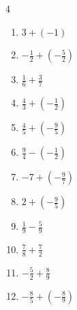 \begin{multicols}{4}
\begin{enumerate}
  \item $\displaystyle 3 + \left(-1\right)$

        \phantom{$\displaystyle =2$}

  \item $\displaystyle -\frac{1}{2} + \left(-\frac{5}{2}\right)$

        \phantom{$\displaystyle =-3$}

  \item $\displaystyle \frac{1}{6} + \frac{3}{7}$


  \item $\displaystyle \frac{4}{3} + \left(-\frac{1}{2}\right)$


  \item $\displaystyle \frac{4}{5} + \left(-\frac{9}{5}\right)$

        \phantom{$\displaystyle =-1$}

  \item $\displaystyle \frac{9}{4} - \left(-\frac{1}{2}\right)$


  \item $\displaystyle -7 + \left(-\frac{9}{7}\right)$


  \item $\displaystyle 2 + \left(-\frac{9}{5}\right)$


\columnbreak %

  \item $\displaystyle \frac{1}{9} - \frac{5}{9}$


  \item $\displaystyle \frac{7}{8} + \frac{7}{2}$


  \item $\displaystyle -\frac{5}{2} + \frac{8}{9}$


  \item $\displaystyle -\frac{8}{5} + \left(-\frac{8}{9}\right)$


\end{enumerate}
\end{multicols}

